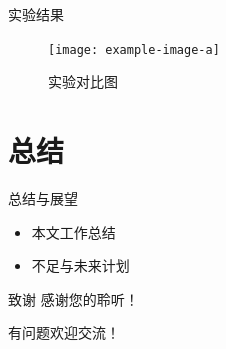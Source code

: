 \documentclass[aspectratio=169]{beamer}  %
\begin{document}
\begin{frame}{实验结果}
  \begin{figure}
    \texttt{[image: example-image-a]}
    \caption{实验对比图}
  \end{figure}
\end{frame}

\section{总结}
\begin{frame}{总结与展望}
  \begin{itemize}
    \item 本文工作总结
    \item 不足与未来计划
  \end{itemize}
\end{frame}

\begin{frame}{致谢}
  \centering
  感谢您的聆听！\par
  \vspace{1cm}
  有问题欢迎交流！
\end{frame}
\end{document}
